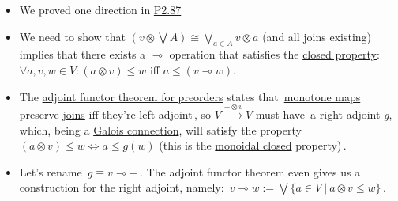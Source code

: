 \begin{itemize}
    \item  We proved one direction in \href{doc/1 math/Seven Sketches in Compositionality/Chapter 2: Resource theories/5 Computing presented V-categories with matrix mult/1 Monoidal closed preorders/5 SMP currying}{P2.87}
    \item We need to show that $(v \otimes \bigvee A)\cong  \bigvee_{a \in A} v \otimes a$ (and all joins existing) implies that there exists a $\multimap$ operation that satisfies the \href{doc/1 math/Seven Sketches in Compositionality/Chapter 2: Resource theories/5 Computing presented V-categories with matrix mult/1 Monoidal closed preorders/1 Closed SMP}{closed property}: $\forall a,v,w \in V: (a \otimes v) \leq w$ iff $a \leq (v \multimap w)$.
    \item The \href{doc/1 math/Seven Sketches in Compositionality/Chapter 1: Generative Effects/6 Galois connections/3 Basic theory of Galois connections/3 Adjoint functor theorem for preorders/Adjoint functor theorem for preorders}{adjoint functor theorem for preorders} states that \,\href{doc/1 math/Seven Sketches in Compositionality/Chapter 1: Generative Effects/4 Monotone maps/1 Monotone map}{monotone maps} preserve \href{doc/1 math/Seven Sketches in Compositionality/Chapter 1: Generative Effects/5 Meets and joins/1 Definition and basic examples/Meet and join}{joins} iff they're left adjoint\,, so $V \xrightarrow{-\otimes v} V$ must have \,a right adjoint \emph{g}, which, being a \href{doc/1 math/Seven Sketches in Compositionality/Chapter 1: Generative Effects/6 Galois connections/1 Definition and examples/Galois connection}{Galois connection}, will satisfy the property $(a \otimes v) \leq w \iff a \leq g(w)$ (this is the \href{doc/1 math/Seven Sketches in Compositionality/Chapter 2: Resource theories/5 Computing presented V-categories with matrix mult/1 Monoidal closed preorders/1 Closed SMP}{monoidal closed} property)\,.
    \item Let's rename \,$g \equiv v \multimap -$\,. The adjoint functor theorem even gives us a construction for the right adjoint, namely: \,$v \multimap w:=\bigvee\{a \in V\ |\ a \otimes v \leq w\}$\,.
  \end{itemize}
